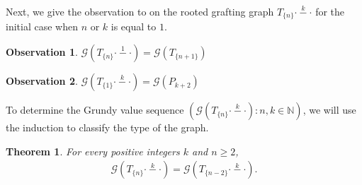 \documentclass[12pt]{elsarticle}
\newtheorem{theorem}{Theorem}[section]
\newtheorem*{theorem A}{Theorem A}
\newtheorem*{theorem B}{N\"olker's Theorem}
\newtheorem{observation}{Observation}
\theoremstyle{remark}
\theoremstyle{remark}
\theoremstyle{definition}
\begin{document}
Next, we give the observation to on the rooted grafting graph $T_{\{n\}} \stackrel{k}{\cdot - \cdot}$ for the initial case when $n$ or $k$ is equal to $1$.
\begin{observation}
	$\mathcal{G}\left(T_{\{n\}} \stackrel{1}{\cdot - \cdot}\right) = \mathcal{G}\left(T_{\{n+1\}} \right)$
\end{observation}
\begin{observation}
	$\mathcal{G}\left(T_{\{1\}} \stackrel{k}{\cdot - \cdot}\right) = \mathcal{G}\left(P_{k+2} \right)$
\end{observation}
To determine the Grundy value sequence $\left(\mathcal{G}\left(T_{\{n\}} \stackrel{k}{\cdot - \cdot}\right): n,k \in \mathbb{N}\right)$, we will use the induction to classify the type of the graph.
\begin{theorem}
	For every positive integers $k$ and $n \ge 2$, 
	\begin{align*}
		\mathcal{G}\left(T_{\{n\}} \stackrel{k}{\cdot - \cdot}\right) = \mathcal{G}\left(T_{\{n-2\}} \stackrel{k}{\cdot - \cdot}\right).
	\end{align*}
\end{theorem}
\end{document}
